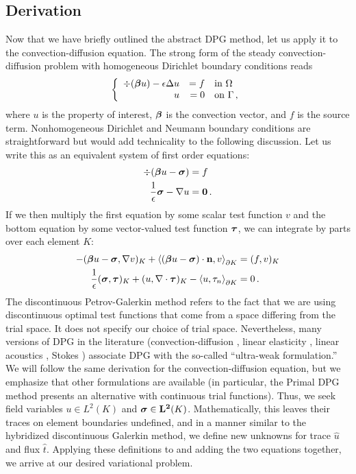 \documentclass[Proposal.tex]{subfiles}
\begin{document}
\subsection{Derivation}
Now that we have briefly outlined the abstract DPG method, let us apply it to
the convection-diffusion equation. The strong form of the steady
convection-diffusion problem with homogeneous Dirichlet boundary conditions reads
\[
\left\{
\begin{array}[c]{rrl}
\div(\boldsymbol\beta u)-\epsilon\Delta u & =f & \text{in }\Omega\\
u & =0 & \text{on }\Gamma\,,
\end{array}
\right.
\]
where $u$ is the property of interest, $\boldsymbol{\beta}$ is the convection vector,
and $f$ is the source term. Nonhomogeneous Dirichlet and Neumann boundary
conditions are straightforward but would add technicality to the following
discussion. Let us write this as an equivalent system of first
order equations:
\begin{align*}
\div(\boldsymbol\beta u-\boldsymbol\sigma)&=f\\
\frac{1}{\epsilon}\boldsymbol\sigma-\nabla u&=\boldsymbol{0}\,.
\end{align*}
If we then multiply the first equation by some scalar test function $v$ and the
bottom equation by some vector-valued test function $\boldsymbol\tau$, we can integrate by
parts over each element $K$:
\begin{equation}
\label{eq:preultraweak}
\begin{aligned}
-(\boldsymbol\beta u-\boldsymbol\sigma,\nabla v)_K+\left\langle (\boldsymbol\beta
u-\boldsymbol\sigma)\cdot\mathbf{n},v \right\rangle_{\partial K}&=(f,v)_K\\
\frac{1}{\epsilon}(\boldsymbol\sigma,\boldsymbol\tau)_K+(u,\nabla\cdot\boldsymbol\tau)_K
-\left\langle u,\tau_n \right\rangle_{\partial K}&=0\,.
\end{aligned}
\end{equation}
The discontinuous Petrov-Galerkin method refers to the fact that we are using
discontinuous optimal test functions that come from a space differing from the
trial space. It does not specify our choice of trial space. Nevertheless, many
versions of DPG in the literature (convection-diffusion \cite{DPG6},
linear elasticity \cite{BramwellDemkowiczGopalakrishnanQiu11}, linear
acoustics \cite{DemkowiczGopalakrishnanMugaZitelli12}, Stokes
\cite{DPGStokes}) associate DPG with the so-called ``ultra-weak formulation.''
We will follow the same derivation for the convection-diffusion equation, but
we emphasize that other formulations are available (in particular, the
Primal DPG\cite{PrimalDPG} method presents an alternative with
continuous trial functions). Thus, we seek field variables $u\in L^2(K)$ and
$\boldsymbol\sigma\in\mathbf{L^2}(K)$. Mathematically, this leaves their traces on element
boundaries undefined, and in a manner similar to the hybridized discontinuous
Galerkin method, we define new unknowns for trace $\hat u$ and flux $\hat t$.
Applying these definitions to  and adding the two
equations together, we arrive at our desired variational problem.
\end{document}
